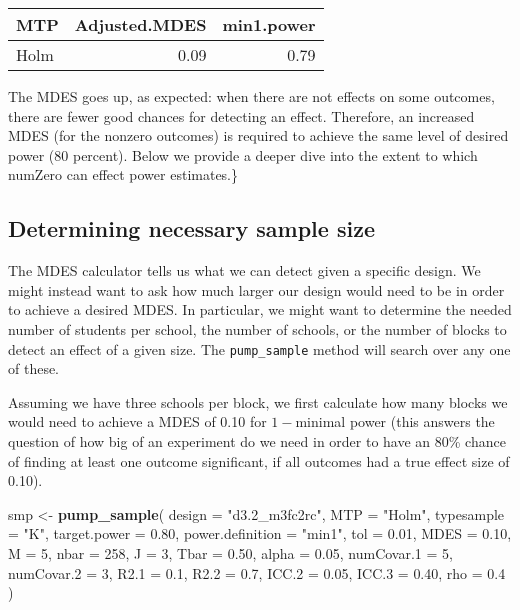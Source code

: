 \documentclass[
]{article}
\newenvironment{Shaded}{\begin{snugshade}}{\end{snugshade}}
\newcommand{\DataTypeTok}[1]{\textcolor[rgb]{0.13,0.29,0.53}{#1}}
\newcommand{\DecValTok}[1]{\textcolor[rgb]{0.00,0.00,0.81}{#1}}
\newcommand{\FloatTok}[1]{\textcolor[rgb]{0.00,0.00,0.81}{#1}}
\newcommand{\KeywordTok}[1]{\textcolor[rgb]{0.13,0.29,0.53}{\textbf{#1}}}
\newcommand{\NormalTok}[1]{#1}
\newcommand{\StringTok}[1]{\textcolor[rgb]{0.31,0.60,0.02}{#1}}
\begin{document}
\begin{tabular}{l|r|r}
\hline
MTP & Adjusted.MDES & min1.power\\
\hline
Holm & 0.09 & 0.79\\
\hline
\end{tabular}

The MDES goes up, as expected: when there are not effects on some
outcomes, there are fewer good chances for detecting an effect.
Therefore, an increased MDES (for the nonzero outcomes) is required to
achieve the same level of desired power (80 percent). Below we provide a
deeper dive into the extent to which numZero can effect power
estimates.\}

\subsection{Determining necessary sample size}

The MDES calculator tells us what we can detect given a specific design.
We might instead want to ask how much larger our design would need to be
in order to achieve a desired MDES. In particular, we might want to
determine the needed number of students per school, the number of
schools, or the number of blocks to detect an effect of a given size.
The \texttt{pump\_sample} method will search over any one of these.

Assuming we have three schools per block, we first calculate how many
blocks we would need to achieve a MDES of 0.10 for \(1-\)minimal power
(this answers the question of how big of an experiment do we need in
order to have an 80\% chance of finding at least one outcome
significant, if all outcomes had a true effect size of 0.10).

\begin{Shaded}
\begin{Highlighting}[]
\NormalTok{smp \textless{}{-}}\StringTok{ }\KeywordTok{pump\_sample}\NormalTok{(}
  \DataTypeTok{design =} \StringTok{"d3.2\_m3fc2rc"}\NormalTok{,}
  \DataTypeTok{MTP =} \StringTok{"Holm"}\NormalTok{,}
  \DataTypeTok{typesample =} \StringTok{"K"}\NormalTok{,}
  \DataTypeTok{target.power =} \FloatTok{0.80}\NormalTok{, }\DataTypeTok{power.definition =} \StringTok{"min1"}\NormalTok{, }\DataTypeTok{tol =} \FloatTok{0.01}\NormalTok{,}
  \DataTypeTok{MDES =} \FloatTok{0.10}\NormalTok{, }\DataTypeTok{M =} \DecValTok{5}\NormalTok{, }\DataTypeTok{nbar =} \DecValTok{258}\NormalTok{, }\DataTypeTok{J =} \DecValTok{3}\NormalTok{,}
  \DataTypeTok{Tbar =} \FloatTok{0.50}\NormalTok{, }\DataTypeTok{alpha =} \FloatTok{0.05}\NormalTok{, }\DataTypeTok{numCovar.1 =} \DecValTok{5}\NormalTok{, }\DataTypeTok{numCovar.2 =} \DecValTok{3}\NormalTok{,}
  \DataTypeTok{R2.1 =} \FloatTok{0.1}\NormalTok{, }\DataTypeTok{R2.2 =} \FloatTok{0.7}\NormalTok{, }\DataTypeTok{ICC.2 =} \FloatTok{0.05}\NormalTok{, }\DataTypeTok{ICC.3 =} \FloatTok{0.40}\NormalTok{, }\DataTypeTok{rho =} \FloatTok{0.4}\NormalTok{ )}
\end{Highlighting}
\end{Shaded}
\end{document}
